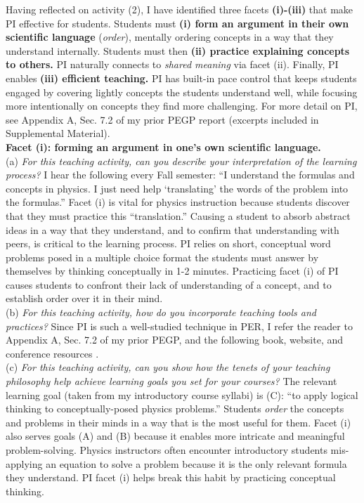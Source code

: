 \documentclass[../../../main.tex]{subfiles}
\begin{document}
Having reflected on activity (2), I have identified three facets \textbf{(i)-(iii)} that make PI effective for students.  Students must \textbf{(i) form an argument in their own scientific language} (\textit{order}), mentally ordering concepts in a way that they understand internally.  Students must then \textbf{(ii) practice explaining concepts to others.}  PI naturally connects to \textit{shared meaning} via facet (ii).  Finally, PI enables \textbf{(iii) efficient teaching.}  PI has built-in pace control that keeps students engaged by covering lightly concepts the students understand well, while focusing more intentionally on concepts they find more challenging.  For more detail on PI, see Appendix A, Sec. 7.2 of my prior PEGP report (excerpts included in Supplemental Material).
\\
\vspace{0.15cm}
\textbf{Facet (i): forming an argument in one's own scientific language.}
\\
\vspace{0.15cm}
(a) \textit{For this teaching activity, can you describe your interpretation of the learning process?}  I hear the following every Fall semester: ``I understand the formulas and concepts in physics.  I just need help `translating' the words of the problem into the formulas.''  Facet (i) is vital for physics instruction because students discover that they must practice this ``translation.''  Causing a student to absorb abstract ideas in a way that they understand, and to confirm that understanding with peers, is critical to the learning process.  PI relies on short, conceptual word problems posed in a multiple choice format the students must answer by themselves by thinking conceptually in 1-2 minutes.  Practicing facet (i) of PI causes students to confront their lack of understanding of a concept, and to establish order over it in their mind.
\\
\vspace{0.15cm}
(b) \textit{For this teaching activity, how do you incorporate teaching tools and practices?}  Since PI is such a well-studied technique in PER, I refer the reader to Appendix A, Sec. 7.2 of my prior PEGP, and the following book, website, and conference resources \cite{mazur2013peer,PhysPort,AAPTPI}.
\\
\vspace{0.15cm}
(c) \textit{For this teaching activity, can you show how the tenets of your teaching philosophy help achieve learning goals you set for your courses?}  The relevant learning goal (taken from my introductory course syllabi) is (C): ``to apply logical thinking to conceptually-posed physics problems.''  Students \textit{order} the concepts and problems in their minds in a way that is the most useful for them.  Facet (i) also serves goals (A) and (B) because it enables more intricate and meaningful problem-solving.  Physics instructors often encounter introductory students mis-applying an equation to solve a problem because it is the only relevant formula they understand.  PI facet (i) helps break this habit by practicing conceptual thinking.
\end{document}
